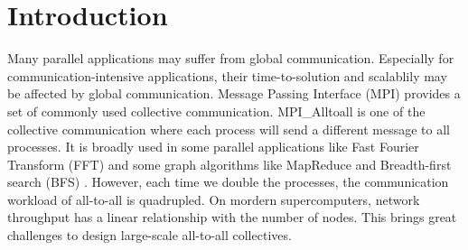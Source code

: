 \section{Introduction}




Many parallel applications may suffer from global communication.
Especially for communication-intensive applications, their time-to-solution and scalablily may be affected by global communication. 
Message Passing Interface (MPI) provides a set of commonly used collective communication.
MPI\_Alltoall is one of the collective communication where each process will send a different message to all processes.
It is broadly used in some parallel applications like Fast Fourier Transform (FFT) \cite{mehta2021parallel} and some graph algorithms like MapReduce \cite{plimpton2011mapreduce} and Breadth-first search (BFS) \cite{ueno2012highly}.
However, each time we double the processes, the communication workload of all-to-all is quadrupled.
On mordern supercomputers, network throughput has a linear relationship with the number of nodes.
This brings great challenges to design large-scale all-to-all collectives.

